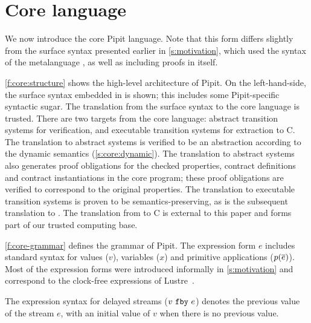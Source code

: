 
\section{Core language}
\label{s:core}



We now introduce the core Pipit language.
Note that this form differs slightly from the surface syntax presented earlier in \autoref{s:motivation}, which used the syntax of the metalanguage \fstar{}, as well as including proofs in \fstar{} itself.


\autoref{f:core:structure} shows the high-level architecture of Pipit.
On the left-hand-side, the surface syntax embedded in \fstar{} is shown; this includes some Pipit-specific syntactic sugar.
The translation from the surface syntax to the core language is trusted.
There are two targets from the core language: abstract transition systems for verification, and executable transition systems for extraction to C.
The translation to abstract systems is verified to be an abstraction according to the dynamic semantics (\autoref{s:core:dynamic}).
The translation to abstract systems also generates proof obligations for the checked properties, contract definitions and contract instantiations in the core program; these proof obligations are verified to correspond to the original properties.
The translation to executable transition systems is proven to be semantics-preserving, as is the subsequent translation to \lowstar{}.
The translation from \lowstar{} to C is external to this paper and forms part of our trusted computing base.


\autoref{f:core-grammar} defines the grammar of Pipit.
The expression form $e$ includes standard syntax for values ($v$), variables ($x$) and primitive applications ($p(\overline{e})$).
Most of the expression forms were introduced informally in \autoref{s:motivation} and correspond to the clock-free expressions of Lustre~\cite{caspi1995functional}.



The expression syntax for delayed streams ($v~\texttt{fby}~e$) denotes the previous value of the stream $e$, with an initial value of $v$ when there is no previous value.

